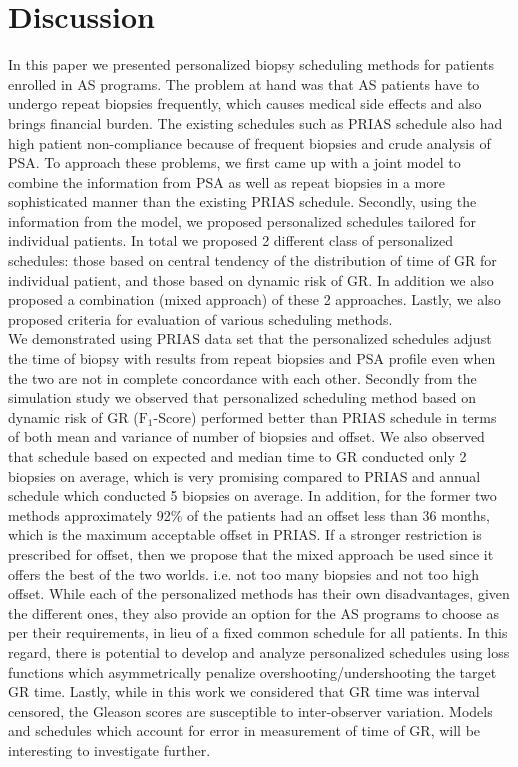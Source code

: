 
\section{Discussion}
\label{sec: discussion}

In this paper we presented personalized biopsy scheduling methods for patients enrolled in AS programs. The problem at hand was that AS patients have to undergo repeat biopsies frequently, which causes medical side effects and also brings financial burden. The existing schedules such as PRIAS schedule also had high patient non-compliance because of frequent biopsies and crude analysis of PSA. To approach these problems, we first came up with a joint model to combine the information from PSA as well as repeat biopsies in a more sophisticated manner than the existing PRIAS schedule. Secondly, using the information from the model, we proposed personalized schedules tailored for individual patients. In total we proposed 2 different class of personalized schedules: those based on central tendency of the distribution of time of GR for individual patient, and those based on dynamic risk of GR. In addition we also proposed a combination (mixed approach) of these 2 approaches. Lastly, we also proposed criteria for evaluation of various scheduling methods.\\

We demonstrated using PRIAS data set that the personalized schedules adjust the time of biopsy with results from repeat biopsies and PSA profile even when the two are not in complete concordance with each other. Secondly from the simulation study we observed that personalized scheduling method based on dynamic risk of GR ($\text{F}_1$-Score) performed better than PRIAS schedule in terms of both mean and variance of number of biopsies and offset. We also observed that schedule based on expected and median time to GR conducted only 2 biopsies on average, which is very promising compared to PRIAS and annual schedule which conducted 5 biopsies on average. In addition, for the former two methods approximately 92\% of the patients had an offset less than 36 months, which is the maximum acceptable offset in PRIAS. If a stronger restriction is prescribed for offset, then we propose that the mixed approach be used since it offers the best of the two worlds. i.e. not too many biopsies and not too high offset. While each of the personalized methods has their own disadvantages, given the different ones, they also provide an option for the AS programs to choose as per their requirements, in lieu of a fixed common schedule for all patients. In this regard, there is potential to develop and analyze personalized schedules using loss functions which asymmetrically penalize overshooting/undershooting the target GR time. Lastly, while in this work we considered that GR time was interval censored, the Gleason scores are susceptible to inter-observer variation. Models and schedules which account for error in measurement of time of GR, will be interesting to investigate further.